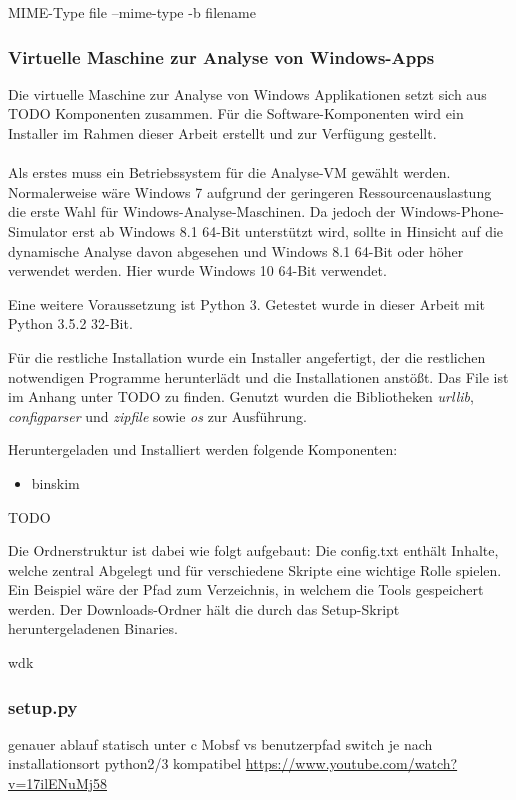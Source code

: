 MIME-Type
file --mime-type -b filename

\subsubsection{Virtuelle Maschine zur Analyse von Windows-Apps}
Die virtuelle Maschine zur Analyse von Windows Applikationen setzt sich aus TODO Komponenten zusammen. Für die Software-Komponenten wird ein Installer im Rahmen dieser Arbeit erstellt und zur Verfügung gestellt.
\\\\
Als erstes muss ein Betriebssystem für die Analyse-VM gewählt werden. Normalerweise wäre Windows 7 aufgrund der geringeren Ressourcenauslastung die erste Wahl für Windows-Analyse-Maschinen. Da jedoch der Windows-Phone-Simulator erst ab Windows 8.1 64-Bit unterstützt wird, sollte in Hinsicht auf die dynamische Analyse davon abgesehen und Windows 8.1 64-Bit oder höher verwendet werden. Hier wurde Windows 10 64-Bit verwendet.

Eine weitere Voraussetzung ist Python 3. Getestet wurde in dieser Arbeit mit Python 3.5.2 32-Bit.

Für die restliche Installation wurde ein Installer angefertigt, der die restlichen notwendigen Programme herunterlädt und die Installationen anstößt. Das File ist im Anhang unter TODO zu finden. Genutzt wurden die Bibliotheken \textit{urllib}, \textit{configparser} und \textit{zipfile} sowie \textit{os} zur Ausführung.

Heruntergeladen und Installiert werden folgende Komponenten:
\begin{itemize}
	\item binskim
\end{itemize}
TODO

Die Ordnerstruktur ist dabei wie folgt aufgebaut:
Die config.txt enthält Inhalte, welche zentral Abgelegt und für verschiedene Skripte eine wichtige Rolle spielen. Ein Beispiel wäre der Pfad zum Verzeichnis, in welchem die Tools gespeichert werden.
Der Downloads-Ordner hält die durch das Setup-Skript heruntergeladenen Binaries.

wdk

\subsubsection{setup.py}
genauer ablauf
statisch unter c Mobsf vs benutzerpfad
switch je nach installationsort
python2/3 kompatibel
\url{https://www.youtube.com/watch?v=17ilENuMj58}


